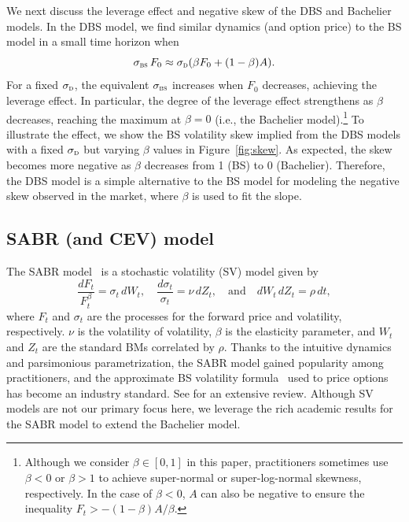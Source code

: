 \documentclass[a4paper,review]{elsarticle}
\newcommand{\qtext}[2][\quad]{#1\text{#2}#1}
\newcommand{\sigmad}{\sigma_\textsc{d}}
\newcommand{\sigmabs}{\sigma_\textsc{bs}}
\newcommand{\vov}{\nu}
\begin{document}
We next discuss the leverage effect and negative skew of the DBS and Bachelier models. In the DBS model, we find similar dynamics (and option price) to the BS model in a small time horizon when
$$ \sigmabs\,F_0 \approx \sigmad(\beta F_0+ (1-\beta)A).
$$
For a fixed $\sigmad$, the equivalent $\sigmabs$ increases when $F_0$ decreases, achieving the leverage effect. In particular, the degree of the leverage effect strengthens as $\beta$ decreases, reaching the maximum at $\beta=0$ (i.e., the Bachelier model).\footnote{Although we consider $\beta\in[0, 1]$ in this paper, practitioners sometimes use $\beta<0$ or $\beta>1$ to achieve super-normal or super-log-normal skewness, respectively. In the case of $\beta<0$, $A$ can also be negative to ensure the inequality $F_t > -(1-\beta)A/\beta$.} To illustrate the effect, we show the BS volatility skew implied from the DBS models with a fixed $\sigmad$ but varying $\beta$ values in Figure~\ref{fig:skew}. As expected, the skew becomes more negative as $\beta$ decreases from 1 (BS) to 0 (Bachelier). Therefore, the DBS model is a simple alternative to the BS model for modeling the negative skew observed in the market, where $\beta$ is used to fit the slope. 

\subsection{SABR (and CEV) model} \label{ssec:sabr} \noindent
The SABR model~\citep{hagan2002sabr} is a stochastic volatility (SV) model given by
\begin{equation} \label{eq:sabr}
	\frac{dF_t}{F_t^\beta} = \sigma_t\, dW_t, \quad
	\frac{d \sigma_t}{\sigma_t} = \vov \, dZ_t, \qtext{and}
	dW_t\,dZ_t = \rho\, dt,
\end{equation}
where $F_t$ and $\sigma_t$ are the processes for the forward price and volatility, respectively. $\vov$ is the volatility of volatility, $\beta$ is the elasticity parameter, and $W_t$ and $Z_t$ are the standard BMs correlated by $\rho$. Thanks to the intuitive dynamics and parsimonious parametrization, the SABR model gained popularity among practitioners, and the approximate BS volatility formula~\citep[Eq.~(A.59)]{hagan2002sabr} used to price options has become an industry standard. See \citet{antonov2012advanced} for an extensive review. Although SV models are not our primary focus here, we leverage the rich academic results for the SABR model to extend the Bachelier model.
\end{document}
